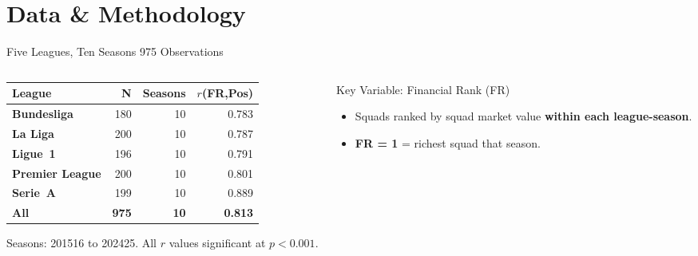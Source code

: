 \documentclass[aspectratio=169,10pt]{beamer}
\begin{document}
\section{Data \& Methodology}

\begin{frame}{Five Leagues, Ten Seasons \textendash{} 975 Observations}
  \begin{columns}[T]
    \begin{column}{0.50\textwidth}
      \vspace{2pt}
      {\small
      \begin{tabular}{%
          >{\bfseries}l r r r}
        \toprule
        \rowcolor{NavyBlue!18}
        \color{white}\textbf{League} &
        \color{white}\textbf{N} &
        \color{white}\textbf{Seasons} &
        \color{white}\textbf{$r$(FR,Pos)} \\
        \midrule
        Bundesliga     & 180 & 10 & 0.783 \\
        \rowcolor{RowA}
        La Liga        & 200 & 10 & 0.787 \\
        Ligue~1        & 196 & 10 & 0.791 \\
        \rowcolor{RowA}
        Premier League & 200 & 10 & 0.801 \\
        Serie~A        & 199 & 10 & 0.889 \\
        \midrule
        \rowcolor{RowB}
        \textbf{All} & \textbf{975} & \textbf{10} & \textbf{0.813} \\
        \bottomrule
      \end{tabular}
      }
      \vspace{6pt}
      {\footnotesize\color{SlateGrey}
        Seasons: 2015\textendash{}16 to 2024\textendash{}25.
        All $r$ values significant at $p < 0.001$.}
    \end{column}
    \begin{column}{0.46\textwidth}
      \vspace{2pt}
      \begin{block}{Key Variable: Financial Rank (FR)}
        \begin{itemize}
          \setlength\itemsep{5pt}
          \item Squads ranked by squad market value
                \textbf{within each league-season}.
          \item \textbf{FR = 1} = richest squad that season.\\

\end{itemize}
\end{block}
\end{column}
\end{columns}
\end{frame}
\end{document}
